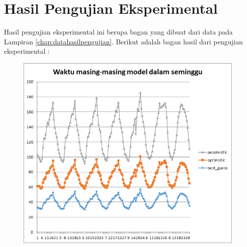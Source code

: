 \chapter{Hasil Pengujian Eksperimental}
\label{chap:hasilpengujianeksperimental}

Hasil pengujian eksperimental ini berupa bagan yang dibuat dari data pada Lampiran \ref{chap:datahasilpengujian}. Berikut adalah bagan hasil dari pengujian eksperimental :

\begin{figure}[H]
				\centering		
				\includegraphics[scale=0.8]{Gambar/waktuallmodelsampel108052017.png}
			\end{figure}
			
